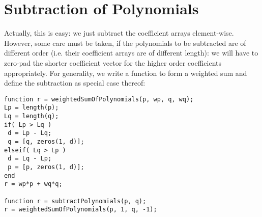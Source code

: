 \section{Subtraction of Polynomials}
Actually, this is easy: we just subtract the coefficient arrays element-wise. However, some care must be taken, if the polynomials to be subtracted are of different order (i.e. their coefficient arrays are of different length): we will have to zero-pad the shorter coefficient vector for the higher order coefficients appropriately. For generality, we write a function to form a weighted sum and define the subtraction as special case thereof:
\begin{verbatim}
function r = weightedSumOfPolynomials(p, wp, q, wq);
Lp = length(p);
Lq = length(q);
if( Lp > Lq )
 d = Lp - Lq;
 q = [q, zeros(1, d)];
elseif( Lq > Lp )
 d = Lq - Lp;
 p = [p, zeros(1, d)];
end
r = wp*p + wq*q;

function r = subtractPolynomials(p, q);
r = weightedSumOfPolynomials(p, 1, q, -1);
\end{verbatim}











